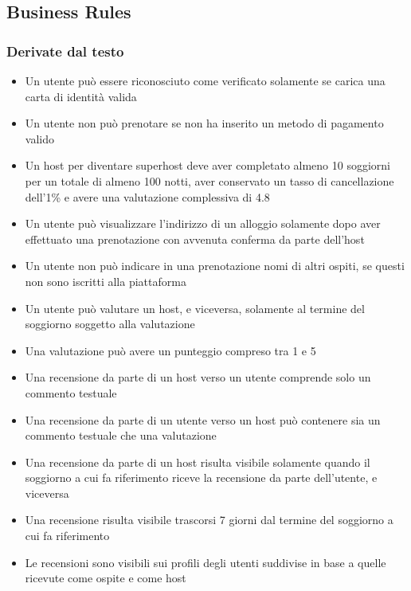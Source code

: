 \subsection{Business Rules}
\subsubsection{Derivate dal testo}
\begin{itemize}
  \item Un utente può essere riconosciuto come verificato solamente se carica una carta di identità valida
  \item Un utente non può prenotare se non ha inserito un metodo di pagamento valido
  \item Un host per diventare superhost deve aver completato almeno 10 soggiorni per un totale di almeno 100 notti, aver conservato un tasso di cancellazione dell'1\% e avere una valutazione complessiva di 4.8 
  \item Un utente può visualizzare l'indirizzo di un alloggio solamente dopo aver effettuato una prenotazione con avvenuta conferma da parte dell'host
  \item Un utente non può indicare in una prenotazione nomi di altri ospiti, se questi non sono iscritti alla piattaforma 
  \item Un utente può valutare un host, e viceversa, solamente al termine del soggiorno soggetto alla valutazione
  \item Una valutazione può avere un punteggio compreso tra 1 e 5
  \item Una recensione da parte di un host verso un utente comprende solo un commento testuale
  \item Una recensione da parte di un utente verso un host può contenere sia un commento testuale che una valutazione
  \item Una recensione da parte di un host risulta visibile solamente quando il soggiorno a cui fa riferimento riceve la recensione da parte dell'utente, e viceversa
  \item Una recensione risulta visibile trascorsi 7 giorni dal termine del soggiorno a cui fa riferimento
  \item Le recensioni sono visibili sui profili degli utenti suddivise in base a quelle ricevute come ospite e come host
\end{itemize}

